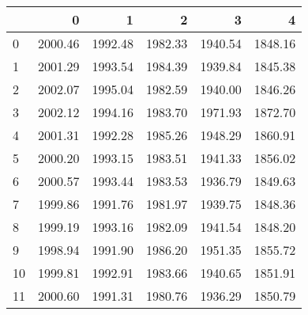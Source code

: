 \begin{tabular}{lrrrrr}
\toprule
{} &        0 &        1 &        2 &        3 &        4 \\
\midrule
0  &  2000.46 &  1992.48 &  1982.33 &  1940.54 &  1848.16 \\
1  &  2001.29 &  1993.54 &  1984.39 &  1939.84 &  1845.38 \\
2  &  2002.07 &  1995.04 &  1982.59 &  1940.00 &  1846.26 \\
3  &  2002.12 &  1994.16 &  1983.70 &  1971.93 &  1872.70 \\
4  &  2001.31 &  1992.28 &  1985.26 &  1948.29 &  1860.91 \\
5  &  2000.20 &  1993.15 &  1983.51 &  1941.33 &  1856.02 \\
6  &  2000.57 &  1993.44 &  1983.53 &  1936.79 &  1849.63 \\
7  &  1999.86 &  1991.76 &  1981.97 &  1939.75 &  1848.36 \\
8  &  1999.19 &  1993.16 &  1982.09 &  1941.54 &  1848.20 \\
9  &  1998.94 &  1991.90 &  1986.20 &  1951.35 &  1855.72 \\
10 &  1999.81 &  1992.91 &  1983.66 &  1940.65 &  1851.91 \\
11 &  2000.60 &  1991.31 &  1980.76 &  1936.29 &  1850.79 \\
\bottomrule
\end{tabular}
